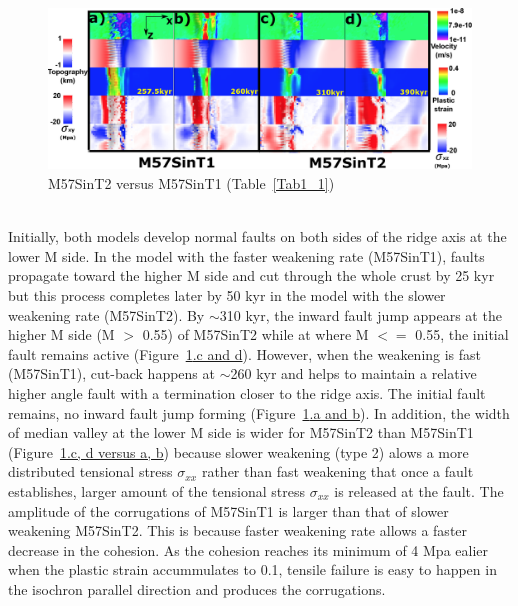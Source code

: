 \begin{figure}[h]
 \centering
  \includegraphics[width=1.0\textwidth]{./Figures/fig_Results_Weakening_2_M57SinT1VST2_CutbackVSsecondaryFault.eps}
 \caption{M57SinT2 versus M57SinT1 (Table~\hyperref[Tab1_1]{\ref{Tab1_1}})}
\label{fig_Results_Weakenging_2}
\end{figure}
~\\
Initially, both models develop normal faults on both sides of the ridge axis at the lower M side. In the model with the faster weakening rate (M57SinT1), faults propagate toward the higher M side and cut through the whole crust by 25 kyr but this process completes later by 50 kyr in the model with the slower weakening rate (M57SinT2). By $\sim$310 kyr, the inward fault jump appears at the higher M side (M $>$ 0.55) of M57SinT2 while at where M $<=$ 0.55, the initial fault remains active (Figure~\hyperref[fig_Results_Weakenging_2]{\ref{fig_Results_Weakenging_2}.c and d}). However, when the weakening is fast (M57SinT1), cut-back happens at $\sim$260 kyr and helps to maintain a relative higher angle fault with a termination closer to the ridge axis. The initial fault remains, no inward fault jump forming (Figure~\hyperref[fig_Results_Weakenging_2]{\ref{fig_Results_Weakenging_2}.a and b}). In addition, the width of median valley at the lower M side is wider for M57SinT2 than M57SinT1 (Figure~\hyperref[fig_Results_Weakenging_2]{\ref{fig_Results_Weakenging_2}.c, d versus a, b}) because slower weakening (type 2) alows a more distributed tensional stress $\sigma_{xx}$ rather than fast weakening that once a fault establishes, larger amount of the tensional stress $\sigma_{xx}$ is released at the fault. The amplitude of the corrugations of M57SinT1 is larger than that of slower weakening M57SinT2. This is because faster weakening rate allows a faster decrease in the cohesion. As the cohesion reaches its minimum of 4 Mpa ealier when the plastic strain accummulates to 0.1, tensile failure is easy to happen in the isochron parallel direction and produces the corrugations.  

